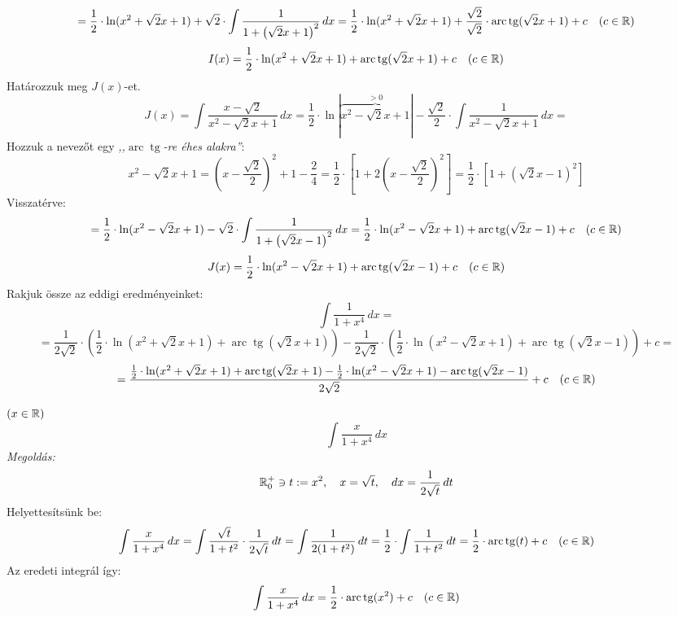 \documentclass[a4paper,11.5pt]{article}
\DeclareMathOperator{\tg}{tg}
\DeclareMathOperator{\arc}{arc}
\begin{document}
\begin{exercise}
 		\[ =\frac{1}{2}\cdot\ln(x^2+\sqrt{2}x+1)+\sqrt{2}\cdot\int\frac{1}{1+\left(\sqrt{2}x+1\right)^2}\,dx=\frac{1}{2}\cdot\ln(x^2+\sqrt{2}x+1)+\frac{\sqrt{2}}{\sqrt{2}}\cdot\arc\tg(\sqrt{2}x+1)+c\quad (c\in\R) \]
 		\[ I(x)=\frac{1}{2}\cdot\ln(x^2+\sqrt{2}x+1)+\arc\tg(\sqrt{2}x+1)+c\quad (c\in\R) \]
 		Határozzuk meg $J(x)$-et.
 		\[ J(x)=\int\frac{x-\sqrt{2}}{x^2-\sqrt{2}x+1}\,dx=\frac{1}{2}\cdot\ln|\overbrace{x^2-\sqrt{2}x+1}^{>0}|-\frac{\sqrt{2}}{2}\cdot\int\frac{1}{x^2-\sqrt{2}x+1}\,dx=\]
 		Hozzuk a nevezőt egy \textit{,,$\arc\tg$-re éhes alakra''}:
 		\[ x^2-\sqrt{2}x+1=\left(x-\frac{\sqrt{2}}{2}\right)^2+1-\frac{2}{4}=\frac{1}{2}\cdot\left[1+2\left(x-\frac{\sqrt{2}}{2}\right)^2\right]=\frac{1}{2}\cdot\left[1+\left(\sqrt{2}x-1\right)^2\right] \]
 		Visszatérve:
 		\[=\frac{1}{2}\cdot\ln(x^2-\sqrt{2}x+1)-\sqrt{2}\cdot\int\frac{1}{1+\left(\sqrt{2}x-1\right)^2}\,dx=\frac{1}{2}\cdot\ln(x^2-\sqrt{2}x+1)+\arc\tg(\sqrt{2}x-1)+c\quad (c\in\R) \]
 		\[ J(x)=\frac{1}{2}\cdot\ln(x^2-\sqrt{2}x+1)+\arc\tg(\sqrt{2}x-1)+c\quad (c\in\R) \]
 		Rakjuk össze az eddigi eredményeinket:
 		\[ \int\frac{1}{1+x^4}\,dx =\]
 		\[=\frac{1}{2\sqrt{2}}\cdot\left(\frac{1}{2}\cdot\ln(x^2+\sqrt{2}x+1)+\arc\tg(\sqrt{2}x+1)\right)-\frac{1}{2\sqrt{2}}\cdot\left(\frac{1}{2}\cdot\ln(x^2-\sqrt{2}x+1)+\arc\tg(\sqrt{2}x-1)\right)+c= \]
 		\[=\frac{\frac{1}{2}\cdot\ln(x^2+\sqrt{2}x+1)+\arc\tg(\sqrt{2}x+1)-\frac{1}{2}\cdot\ln(x^2-\sqrt{2}x+1)-\arc\tg(\sqrt{2}x-1)}{2\sqrt{2}}+c\quad (c\in\R) \]
% 		
	\end{exercise}
	\begin{exercise}$(x\in\mathbb{R})$
		\[ \int\frac{x}{1+x^4}\,dx \]
		\textit{Megoldás:} 
		\[ \mathbb{R}_0^+\ni t:=x^2,\quad x=\sqrt{t},\quad dx=\frac{1}{2\sqrt{t}}\,dt \]
		Helyettesítsünk be:
		\[ \int\frac{x}{1+x^4}\,dx=\int\frac{\sqrt{t}}{1+t^2}\cdot\frac{1}{2\sqrt{t}}\,dt=\int\frac{1}{2(1+t^2)}\,dt=\frac{1}{2}\cdot\int\frac{1}{1+t^2}\,dt=\frac{1}{2}\cdot\arc\tg(t)+c\quad (c\in\R) \]
		Az eredeti integrál így:
		\[ \int\frac{x}{1+x^4}\,dx=\frac{1}{2}\cdot\arc\tg(x^2)+c\quad (c\in\R) \]
	\end{exercise}
\end{document}
